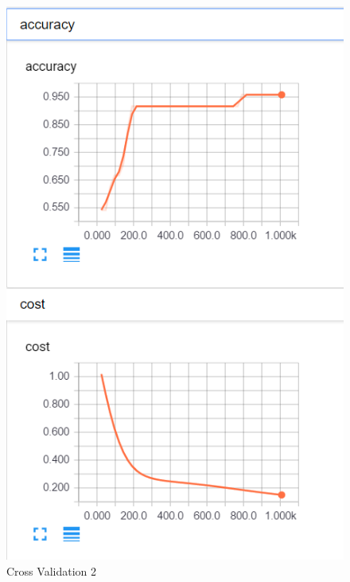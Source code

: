 \documentclass[12pt]{article}
\begin{document}
\begin{figure}[H]
	\begin{center}
	\includegraphics{./pictures/cv2.png}
	\caption{Cross Validation 2}
	\label{GD}
	\end{center}
\end{figure}
\end{document}
